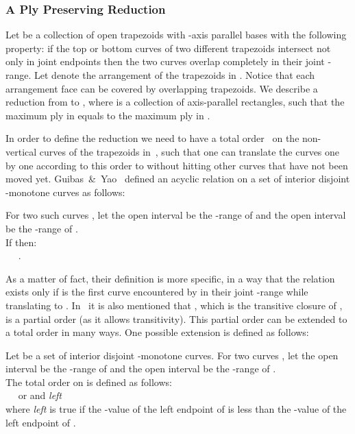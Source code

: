 \subsubsection {A Ply Preserving Reduction}
\label{subsubsec:eff_ver_alg:reduction}

Let \TcollReduc be a collection of open trapezoids with -axis parallel bases
with the following property:
if the top or bottom curves of two different trapezoids intersect
not only in joint endpoints
then the two curves overlap completely in their joint -range.
Let \Arr{\TcollReduc} denote the arrangement
of the trapezoids in \TcollReduc . Notice that each arrangement face can be covered by overlapping trapezoids.
We describe a reduction from \TcollReduc to
\RcollReduc, where \RcollReduc is a collection of
axis-parallel rectangles, such that the maximum ply
in \Arr{\RcollReduc} equals to the
maximum ply in \Arr{\TcollReduc}.

In order to define the reduction
we need to have a total order~
on the non-vertical curves of the
trapezoids in~\TcollReduc,
such that one can translate the curves
one by one
according to this order
to 
without hitting other curves that
have not been moved yet.
Guibas~\&~Yao~\cite{GY-TSR-80} defined
an acyclic relation  on a set  of  interior disjoint
-monotone curves as follows:

\begin{definition}
For two such curves ,
let the open interval  be the -range of 
and the open interval  be the -range of .\\
If  then:\\
\mbox{\ \ } .
\end{definition}

As a matter of fact, their definition is more specific,
in a way that the relation  exists only
if  is the first curve encountered by 
in their joint -range
while translating  to .
In~\cite{GY-TSR-80} it is also mentioned that , which is the transitive closure
of , is a partial order (as it allows transitivity).
This partial order  can be extended to a total order  in many ways.
One possible extension is defined as follows:

\begin{definition}
\label{def:ord}
Let  be a set of interior disjoint -monotone curves.
For two curves ,
let the open interval  be the -range of 
and the open interval  be the -range of .\\
The total order  on  is defined as follows:\\
\mbox{\ \ }  or  and  \emph{left}  \\
where
 \emph{left}  is true if the -value of the left endpoint of  is
less than the -value of the left endpoint of .
\end{definition}

